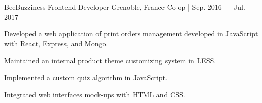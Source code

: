 \begin{cventries}
    \cventry
    {BeeBuzziness} %
    {Frontend Developer} %
    {Grenoble, France} %
    {Co-op | Sep. 2016 — Jul. 2017} %
    {
    \begin{cvitems} %
        \item {Developed a web application of print orders management developed in JavaScript with React, Express, and Mongo.}
        \item {Maintained an internal product theme customizing system in LESS.}
        \item {Implemented a custom quiz algorithm in JavaScript.}
        \item {Integrated web interfaces mock-ups with HTML and CSS.}
    \end{cvitems}
    }

\end{cventries}

